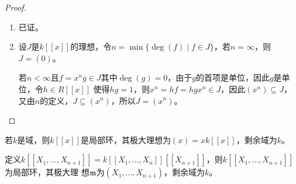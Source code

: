 \documentclass[11pt]{article}
\begin{document}
\begin{proof}
\begin{enumerate}
\item 已证。
\item 设\(J\)是\(k[[x]]\)的理想，令\(n=\min\{\deg(f)\mid f\in J\}\)，若\(n=\infty\)，则\(J=(0)\)。

若\(n<\infty\)且\(f=x^ng\in J\)其中\(\deg(g)=0\)，由于\(g\)的首项是单位，因此\(g\)是单位，令\(h\in R[[x]]\)
使得\(hg=1\)，则\(x^n=hf=hgx^n\in J\)，因此\((x^n)\subseteq J\)，又由\(n\)的定义，\(J\subseteq(x^n)\)，所以\(J=(x^n)\)。
\end{enumerate}
\end{proof}

\begin{corollary}[]
若\(k\)是域，则\(k[[x]]\)是局部环，其极大理想为\((x)=xk[[x]]\)，剩余域为\(k\)。
\end{corollary}

\begin{corollary}[]
定义\(k[[X_1,\dots,X_{n+1}]]=k[[X_1,\dots,X_n]][[X_{n+1}]]\)，则\(k[[X_1,\dots,X_{n+1}]]\)为局部环，其极大理
想\(\mathfrak{m}\)为\((X_1,\dots,X_{n+1})\)，剩余域为\(k\)。
\end{corollary}
\end{document}

